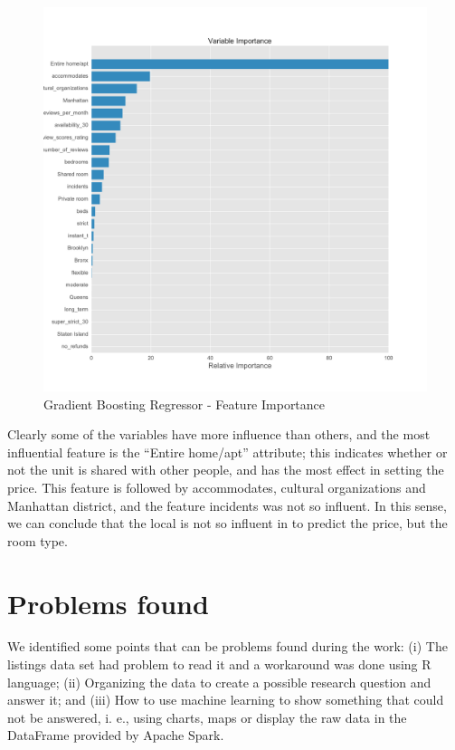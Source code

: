 \documentclass[sigconf]{acmart}
\begin{document}
\begin{figure}[!htpb]
	\centering
	\includegraphics[width=\linewidth]{images/feature_importance_gridSearchCV_price}
	\caption{Gradient Boosting Regressor - Feature Importance}
	\label{fig:featureimportanc_gridSearchCVprice}
\end{figure}

Clearly some of the variables have more influence than others, and the most influential feature is the ``Entire home/apt'' attribute; this indicates whether or not the unit is shared with other people, and has the most effect in setting the price. This feature is followed by accommodates, cultural organizations and Manhattan district, and the feature incidents was not so influent. In this sense, we can conclude that the local is not so influent in to predict the price, but the room type.

\section{Problems found}
\label{sec:problemsfound}

We identified some points that can be problems found during the work: (i) The listings data set had problem to read it and a workaround was done using R language; (ii) Organizing the data to create a possible research question and answer it; and (iii) How to use machine learning to show something that could not be answered, i. e., using charts, maps or display the raw data in the DataFrame provided by Apache Spark.
\end{document}
